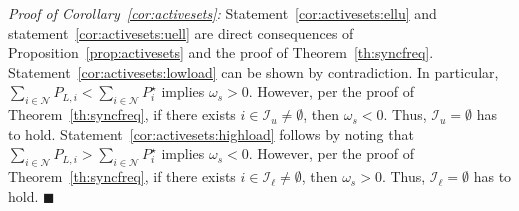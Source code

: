 \documentclass[twocolumn,twoside,journal]{IEEEtran}
\newcommand{\mc}{\mathcal}
\begin{document}
\textit{Proof of Corollary~\ref{cor:activesets}:} Statement~\ref{cor:activesets:ellu} and statement~\ref{cor:activesets:uell} are direct consequences of Proposition~\ref{prop:activesets} and the proof of Theorem~\ref{th:syncfreq}. Statement~\ref{cor:activesets:lowload} can be shown by contradiction. In particular, $\sum_{i \in \mc N} P_{L,i} < \sum_{i \in \mc N} P^\star_i$ implies $\omega_s>0$. However, per the proof of Theorem~\ref{th:syncfreq}, if there exists $i \in \mc I_u \neq \emptyset$, then $\omega_s<0$. Thus, $\mc I_u = \emptyset$ has to hold. Statement~\ref{cor:activesets:highload} follows by noting that $\sum_{i \in \mc N} P_{L,i} > \sum_{i \in \mc N} P^\star_i$ implies $\omega_s<0$. However, per the proof of Theorem~\ref{th:syncfreq}, if there exists $i \in \mc I_\ell \neq \emptyset$, then $\omega_s>0$. Thus, $\mc I_\ell = \emptyset$ has to hold. \hfill $\blacksquare$

 



\end{document}
